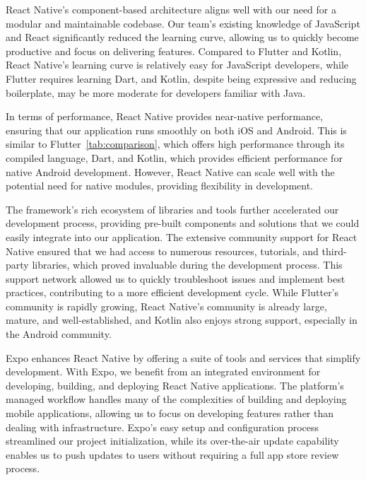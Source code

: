 React Native’s component-based architecture aligns well with our need for a modular and maintainable codebase. Our team’s existing knowledge of JavaScript and React significantly reduced the learning curve, allowing us to quickly become productive and focus on delivering features. Compared to Flutter and Kotlin, React Native's learning curve is relatively easy for JavaScript developers, while Flutter requires learning Dart, and Kotlin, despite being expressive and reducing boilerplate, may be more moderate for developers familiar with Java.

In terms of performance, React Native provides near-native performance, ensuring that our application runs smoothly on both iOS and Android\cite{react-native-performance}. This is similar to Flutter~\ref{tab:comparison}, which offers high performance through its compiled language, Dart, and Kotlin, which provides efficient performance for native Android development. However, React Native can scale well with the potential need for native modules, providing flexibility in development.

The framework’s rich ecosystem of libraries and tools further accelerated our development process, providing pre-built components and solutions that we could easily integrate into our application. The extensive community support for React Native ensured that we had access to numerous resources, tutorials, and third-party libraries, which proved invaluable during the development process. This support network allowed us to quickly troubleshoot issues and implement best practices, contributing to a more efficient development cycle. While Flutter's community is rapidly growing, React Native's community is already large, mature, and well-established, and Kotlin also enjoys strong support, especially in the Android community.

Expo enhances React Native by offering a suite of tools and services that simplify development\cite{Expo}. With Expo, we benefit from an integrated environment for developing, building, and deploying React Native applications. The platform’s managed workflow handles many of the complexities of building and deploying mobile applications, allowing us to focus on developing features rather than dealing with infrastructure. Expo’s easy setup and configuration process streamlined our project initialization, while its over-the-air update capability enables us to push updates to users without requiring a full app store review process.

